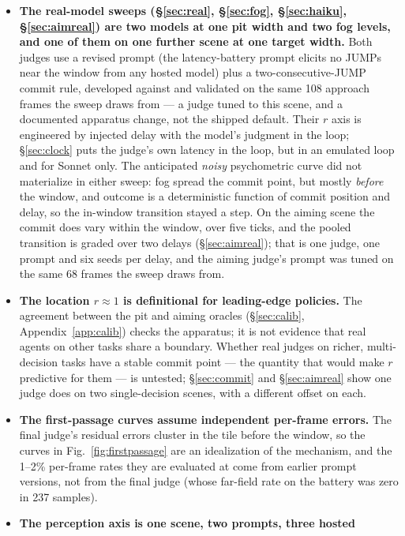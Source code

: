\documentclass[11pt]{article}
\begin{document}
\begin{itemize}
  \item \textbf{The real-model sweeps (\S\ref{sec:real}, \S\ref{sec:fog},
    \S\ref{sec:haiku}, \S\ref{sec:aimreal}) are two models at one pit width
    and two fog levels, and one of them on one further scene at one target
    width.} Both judges use a revised prompt (the latency-battery prompt
    elicits no JUMPs near the window from any hosted model) plus a
    two-consecutive-JUMP commit rule, developed against and validated on the
    same 108 approach frames the sweep draws from --- a judge tuned to this
    scene, and a documented apparatus change, not the shipped default. Their
    $r$ axis is engineered by injected delay with the model's judgment in the
    loop; \S\ref{sec:clock} puts the judge's own latency in the loop, but in
    an emulated loop and for Sonnet only.
    The anticipated \emph{noisy} psychometric curve did not materialize in
    either sweep: fog spread the commit point, but mostly \emph{before} the
    window, and outcome is a deterministic function of commit position and
    delay, so the in-window transition stayed a step. On the aiming scene
    the commit does vary within the window, over five ticks, and the pooled
    transition is graded over two delays (\S\ref{sec:aimreal}); that is
    one judge, one prompt and six seeds per delay, and the aiming judge's
    prompt was tuned on the same 68 frames the sweep draws from.
  \item \textbf{The location $r \approx 1$ is definitional for leading-edge
    policies.} The agreement between the pit and aiming oracles
    (\S\ref{sec:calib}, Appendix~\ref{app:calib}) checks the apparatus; it is not
    evidence that real agents on other tasks share a boundary. Whether real
    judges on richer, multi-decision tasks have a stable commit point --- the
    quantity that would make $r$ predictive for them --- is untested;
    \S\ref{sec:commit} and \S\ref{sec:aimreal} show one judge does on two
    single-decision scenes, with a different offset on each.
  \item \textbf{The first-passage curves assume independent per-frame
    errors.} The final judge's residual errors cluster in the tile before the
    window, so the curves in Fig.~\ref{fig:firstpassage} are an idealization of
    the mechanism, and the 1--2\% per-frame rates they are evaluated at come
    from earlier prompt versions, not from the final judge (whose far-field
    rate on the battery was zero in 237 samples).
  \item \textbf{The perception axis is one scene, two prompts, three hosted
}
\end{itemize}
\end{document}
